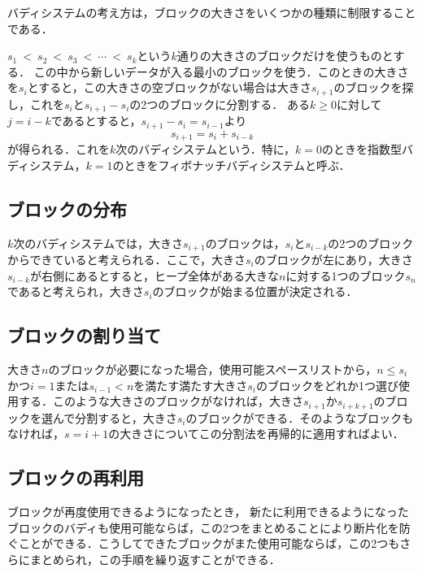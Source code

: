 \documentclass[twocolumn,10pt]{jarticle}
\begin{document}
バディシステムの考え方は，ブロックの大きさをいくつかの種類に制限することである．

$ s_1 ~<~ s_2 ~<~ s_3 ~<~ \cdots ~<~ s_k $という$ k $通りの大きさのブロックだけを使うものとする．
この中から新しいデータが入る最小のブロックを使う．このときの大きさを$ s_i $とすると，この大きさの空ブロックがない場合は大きさ$ s_{i+1} $のブロックを探し，これを$ s_i $と$ s_{i+1} - s_i $の2つのブロックに分割する．
ある$ k \ge 0 $に対して$ j = i - k $であるとすると，$ s_{i+1} - s_i = s_{i-1} $より
%
\begin{equation*}
 s_{i+1} = s_i + s_{i-k}
\end{equation*}
%
が得られる．これを$ k $次のバディシステムという．特に，$ k = 0 $のときを指数型バディシステム，$ k = 1 $のときをフィボナッチバディシステムと呼ぶ．

\subsection{ブロックの分布}
%
$ k $次のバディシステムでは，大きさ$ s_{i+1} $のブロックは，$ s_i $と$ s_{i-k} $の2つのブロックからできていると考えられる．ここで，大きさ$ s_i $のブロックが左にあり，大きさ$ s_{i-k} $が右側にあるとすると，ヒープ全体がある大きな$ n $に対する1つのブロック$ s_n $であると考えられ，大きさ$ s_i $のブロックが始まる位置が決定される．


\subsection{ブロックの割り当て}
%
大きさ$ n $のブロックが必要になった場合，使用可能スペースリストから，$ n \le s_i $かつ$ i = 1 $または$ s_{i-1} < n $を満たす満たす大きさ$ s_i $のブロックをどれか1つ選び使用する．このような大きさのブロックがなければ，大きさ$ s_{i+1} $か$ s_{i+k+1} $のブロックを選んで分割すると，大きさ$ s_i $のブロックができる．そのようなブロックもなければ，$ s = {i+1} $の大きさについてこの分割法を再帰的に適用すればよい．

\subsection{ブロックの再利用}
%
ブロックが再度使用できるようになったとき，
新たに利用できるようになったブロックのバディも使用可能ならば，この2つをまとめることにより断片化を防ぐことができる．こうしてできたブロックがまた使用可能ならば，この2つもさらにまとめられ，この手順を繰り返すことができる．
\end{document}
